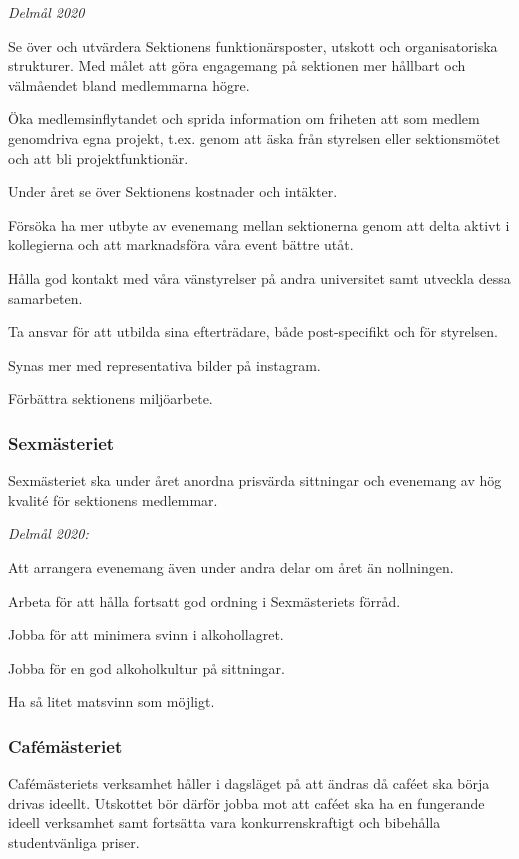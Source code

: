 \documentclass[../_main/handlingar.tex]{subfiles}
\begin{document}
\emph{Delmål 2020}
\begin{dashlist}
    \item Se över och utvärdera Sektionens funktionärsposter, utskott och organisatoriska strukturer. Med målet att göra engagemang på sektionen mer hållbart och välmåendet bland medlemmarna högre. 
    \item Öka medlemsinflytandet och sprida information om friheten att som medlem genomdriva egna projekt, t.ex. genom att äska från styrelsen eller sektionsmötet och att bli projektfunktionär.   
    \item Under året se över Sektionens kostnader och intäkter. 
    \item Försöka ha mer utbyte av evenemang mellan sektionerna genom att delta aktivt i kollegierna och att marknadsföra våra event bättre utåt.
    \item Hålla god kontakt med våra vänstyrelser på andra universitet samt utveckla dessa samarbeten. 
    \item Ta ansvar för att utbilda sina efterträdare, både post-specifikt och för styrelsen.
	\item Synas mer med representativa bilder på instagram.
	\item Förbättra sektionens miljöarbete. \scalebox{0.5}{\recycle}
\end{dashlist}
\newpage
\subsubsection*{Sexmästeriet}
Sexmästeriet ska under året anordna prisvärda sittningar och evenemang av hög kvalité för sektionens medlemmar. 

\emph{Delmål 2020:}
\begin{dashlist}
	\item Att arrangera evenemang även under andra delar om året än nollningen.
	\item Arbeta för att hålla fortsatt god ordning i Sexmästeriets förråd.
	\item Jobba för att minimera svinn i alkohollagret. 
	\item Jobba för en god alkoholkultur på sittningar.
	\item Ha så litet matsvinn som möjligt. 
\end{dashlist}

\subsubsection*{Cafémästeriet}
Cafémästeriets verksamhet håller i dagsläget på att ändras då caféet ska börja drivas ideellt. Utskottet bör därför jobba mot att caféet ska ha en fungerande ideell verksamhet samt fortsätta vara konkurrenskraftigt och bibehålla studentvänliga priser.
\end{document}
